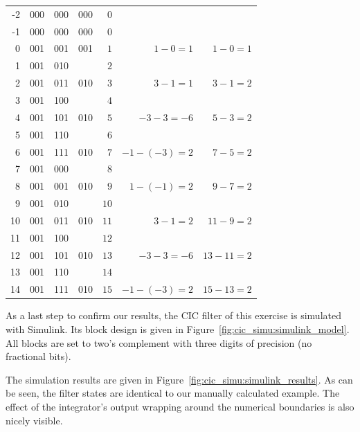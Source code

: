 \begin{table}
\begin{tabular}{rrrrrrr}
        \midrule
        -2 & 000 &  000 & 000 & $ 0$ &                        & \\
        -1 & 000 &  000 & 000 & $ 0$ &                        & \\
         0 & 001 &  001 & 001 & $ 1$ & $  1 -   0  =  1     $ & $ 1 - 0 = 1 $\\
         1 & 001 &  010 &     & $ 2$ &                        & \\
         2 & 001 &  011 & 010 & $ 3$ & $  3 -   1  =  1     $ & $ 3 - 1 = 2 $\\
         3 & 001 &  100 &     & $ 4$ &                        & \\
         4 & 001 &  101 & 010 & $ 5$ & $ -3 -   3  = -6     $ & $ 5 - 3 = 2 $\\
         5 & 001 &  110 &     & $ 6$ &                        & \\
         6 & 001 &  111 & 010 & $ 7$ & $ -1 - (-3) =  2     $ & $ 7 - 5 = 2 $\\
         7 & 001 &  000 &     & $ 8$ &                        & \\
         8 & 001 &  001 & 010 & $ 9$ & $  1 - (-1) =  2     $ & $ 9 - 7 = 2 $\\
         9 & 001 &  010 &     & $10$ &                        & \\
        10 & 001 &  011 & 010 & $11$ & $  3 -   1  =  2     $ & $ 11 - 9 = 2 $\\
        11 & 001 &  100 &     & $12$ &                        & \\
        12 & 001 &  101 & 010 & $13$ & $ -3 -   3  = -6     $ & $ 13 - 11 = 2 $\\
        13 & 001 &  110 &     & $14$ &                        & \\
        14 & 001 &  111 & 010 & $15$ & $ -1 - (-3) =  2     $ & $ 15 - 13 = 2 $\\
        \bottomrule
    \end{tabular}
\end{table}

As  a   last  step   to  confirm   our  results,  the   CIC  filter   of  this
exercise  is   simulated  with   Simulink. Its  block   design  is   given  in
Figure~\ref{fig:cic_simu:simulink_model}. All   blocks   are  set   to   two's
complement with three digits of precision (no fractional bits).

The          simulation         results          are         given          in
Figure~\ref{fig:cic_simu:simulink_results}. As can be  seen, the filter states
are  identical  to   our  manually  calculated  example. The   effect  of  the
integrator's output  wrapping around the  numerical boundaries is  also nicely
visible.

